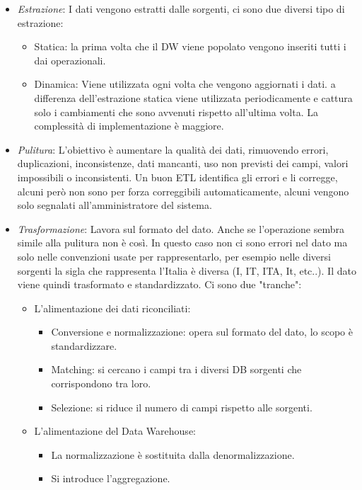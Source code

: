 \begin{itemize}
	\begin{itemize}
		\item \textit{Estrazione}: I dati vengono estratti dalle sorgenti, ci sono due diversi tipo di estrazione:
		\begin{itemize}
			\item Statica: la prima volta che il DW viene popolato vengono inseriti tutti i dai operazionali.
			\item Dinamica: Viene utilizzata ogni volta che vengono aggiornati i dati. a differenza dell'estrazione statica viene utilizzata periodicamente e cattura solo i cambiamenti che sono avvenuti rispetto all'ultima volta. La complessità di implementazione è maggiore.
		\end{itemize}
		\item \textit{Pulitura}: L'obiettivo è aumentare la qualità dei dati, rimuovendo errori, duplicazioni, inconsistenze, dati mancanti, uso non previsti dei campi, valori impossibili o inconsistenti. Un buon ETL identifica gli errori e li corregge, alcuni però non sono per forza correggibili automaticamente, alcuni vengono solo segnalati all'amministratore del sistema.
		\item \textit{Trasformazione}: Lavora sul formato del dato. Anche se l'operazione sembra simile alla pulitura non è così. In questo caso non ci sono errori nel dato ma solo nelle convenzioni usate per rappresentarlo, per esempio nelle diversi sorgenti la sigla che rappresenta l'Italia è diversa (I, IT, ITA, It, etc..). Il dato viene quindi trasformato e standardizzato.\newline
		Ci sono due "tranche":
		\begin{itemize}
			\item L'alimentazione dei dati riconciliati:
			\begin{itemize}
				\item Conversione e normalizzazione: opera sul formato del dato, lo scopo è standardizzare.
				\item Matching: si cercano i campi tra i diversi DB sorgenti che corrispondono tra loro.
				\item Selezione: si riduce il numero di campi rispetto alle sorgenti.
			\end{itemize}
			\item L'alimentazione del Data Warehouse:
			\begin{itemize}
				\item La normalizzazione è sostituita dalla denormalizzazione.
				\item Si introduce l'aggregazione.

\end{itemize}
\end{itemize}
\end{itemize}
\end{itemize}
